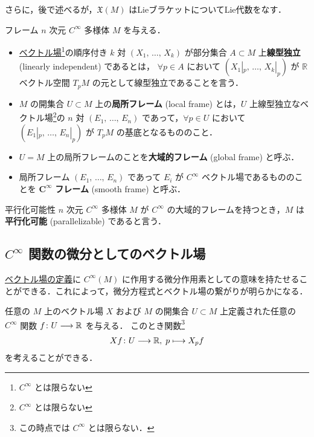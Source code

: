 \documentclass[TQFT_main]{subfiles}
\begin{document}
さらに，後で述べるが，$\mathfrak{X}(M)$ はLieブラケットについてLie代数をなす．

\begin{mydef}[label=def:smoothframe]{フレーム}
    $n$ 次元 $C^\infty$ 多様体 $M$ を与える．
    \begin{itemize}
        \item \hyperref[def:vecf]{ベクトル場}\footnote{$C^\infty$ とは限らない}の順序付き $k$ 対 $(X_1,\, \dots,\, X_k)$ が部分集合 $A \subset M$ 上\textbf{線型独立} (linearly independent) であるとは， $\forall p \in A$ において $(X_1|_p,\, \dots,\, X_k|_p)$ が $\mathbb{R}$ ベクトル空間 $T_p M$ の元として線型独立であることを言う．
        \item $M$ の開集合 $U \subset M$ 上の\textbf{局所フレーム} (local frame) とは，$U$ 上線型独立なベクトル場\footnote{$C^\infty$ とは限らない}の $n$ 対 $(E_1,\, \dots,\, E_n)$ であって，$\forall p \in U$ において $(E_1|_p,\, \dots,\, E_n|_p)$ が $T_p M$ の基底となるもののこと．
        \item $U = M$ 上の局所フレームのことを\textbf{大域的フレーム} (global frame) と呼ぶ．
        \item 局所フレーム  $(E_1,\, \dots,\, E_n)$ であって $E_i$ が $C^\infty$ ベクトル場であるもののことを $\bm{C^\infty}$ \textbf{フレーム} (smooth frame) と呼ぶ．
    \end{itemize}
\end{mydef}

\begin{mydef}[label=def:parallel]{平行化可能性}
    $n$ 次元 $C^\infty$ 多様体 $M$ が $C^\infty$ の大域的フレームを持つとき，$M$ は\textbf{平行化可能} (parallelizable) であると言う．
\end{mydef}


\subsection{$C^\infty$ 関数の微分としてのベクトル場}

\hyperref[def:vecf]{ベクトル場の定義}に $C^\infty (M)$ に作用する微分作用素としての意味を持たせることができる．これによって，微分方程式とベクトル場の繋がりが明らかになる．

任意の $M$ 上のベクトル場 $X$ および $M$ の開集合 $U \subset M$ 上定義された任意の $C^\infty$ 関数 $f \colon U \longrightarrow \mathbb{R}$ を与える．
このとき関数\footnote{この時点では $C^\infty$ とは限らない．}
\begin{align}
    Xf \colon U \longrightarrow \mathbb{R},\; p \longmapsto X_p f
\end{align}
を考えることができる．
\end{document}

